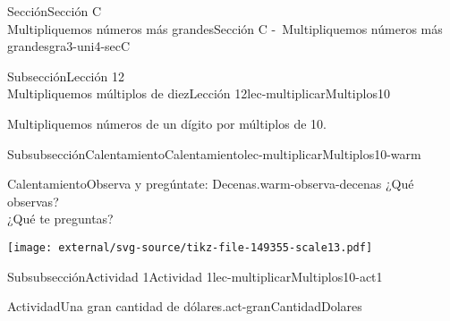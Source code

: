 \begin{sectionptx}{Sección}{{\Large Sección C\\}Multipliquemos números más grandes}{}{Sección C -~Multipliquemos números más grandes}{}{}{gra3-uni4-secC}
%
%
\typeout{************************************************}
\typeout{************************************************}
%
\begin{subsectionptx}{Subsección}{{\normalsize Lección 12\\[-0.05cm]}Multipliquemos múltiplos de diez}{}{Lección 12}{}{}{lec-multiplicarMultiplos10}
\begin{introduction}{}%
Multipliquemos números de un dígito por múltiplos de 10.%
\end{introduction}%
%
%
\typeout{************************************************}
\typeout{************************************************}
%
\begin{subsubsectionptx}{Subsubsección}{Calentamiento}{}{Calentamiento}{}{}{lec-multiplicarMultiplos10-warm}
\begin{exploration}{Calentamiento}{Observa y pregúntate: Decenas.}{warm-observa-decenas}%
¿Qué observas?\\
 ¿Qué te preguntas?%
\begin{image}{0}{1}{0}{}%
\texttt{[image: external/svg-source/tikz-file-149355-scale13.pdf]}
\end{image}%
\end{exploration}%
\end{subsubsectionptx}
%
%
\typeout{************************************************}
\typeout{************************************************}
%
\begin{subsubsectionptx}{Subsubsección}{Actividad 1}{}{Actividad 1}{}{}{lec-multiplicarMultiplos10-act1}
\begin{activity}{Actividad}{Una gran cantidad de dólares.}{act-granCantidadDolares}%

\end{activity}
\end{subsubsectionptx}
\end{subsectionptx}
\end{sectionptx}
